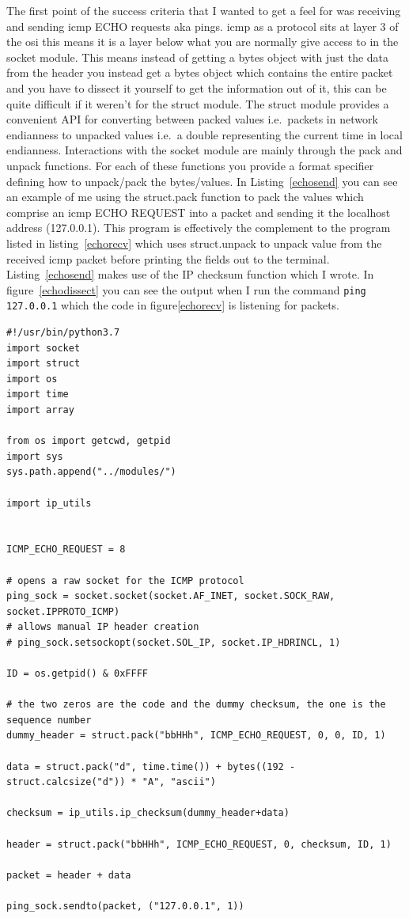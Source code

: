 \documentclass[titlepage]{article}
\begin{document}
The first point of the success criteria that I wanted to get a feel for was receiving and sending
\gls{icmp} ECHO requests aka pings. \gls{icmp} as a protocol sits at layer 3 of the \gls{osi}
this means it is a layer below what you are normally give access to in the socket module. This
means instead of getting a bytes object with just the data from the header you instead get a bytes
object which contains the entire packet and you have to dissect it yourself to get the information
out of it, this can be quite difficult if it weren't for the struct module. The struct module 
provides a convenient API for converting between packed values i.e.\ packets in network endianness
to unpacked values i.e.\ a double representing the current time in local endianness. Interactions
with the socket module are mainly through the pack and unpack functions. For each of these
functions you provide a format specifier defining how to unpack/pack the bytes/values. 
In Listing~\ref{echosend} you can see an example of me using the struct.pack function to pack
the values which comprise an \gls{icmp} ECHO REQUEST into a packet and sending it the localhost
address (127.0.0.1). This program is effectively the complement to the program listed in
listing~\ref{echorecv} which uses struct.unpack to unpack value from the received \gls{icmp}
packet before printing the fields out to the terminal. Listing~\ref{echosend} makes use of the
IP checksum function which I wrote. In figure~\ref{echodissect} you can see the output when
I run the command \verb|ping 127.0.0.1| which the code in figure\ref{echorecv} is listening for
packets.

\begin{lstlisting}[label=echosend,caption=A prototype for sending \gls{icmp} ECHO REQUEST packets.]
#!/usr/bin/python3.7
import socket
import struct
import os
import time
import array

from os import getcwd, getpid
import sys
sys.path.append("../modules/")

import ip_utils


ICMP_ECHO_REQUEST = 8

# opens a raw socket for the ICMP protocol
ping_sock = socket.socket(socket.AF_INET, socket.SOCK_RAW, socket.IPPROTO_ICMP)
# allows manual IP header creation
# ping_sock.setsockopt(socket.SOL_IP, socket.IP_HDRINCL, 1)

ID = os.getpid() & 0xFFFF

# the two zeros are the code and the dummy checksum, the one is the sequence number
dummy_header = struct.pack("bbHHh", ICMP_ECHO_REQUEST, 0, 0, ID, 1)

data = struct.pack("d", time.time()) + bytes((192 - struct.calcsize("d")) * "A", "ascii")

checksum = ip_utils.ip_checksum(dummy_header+data)

header = struct.pack("bbHHh", ICMP_ECHO_REQUEST, 0, checksum, ID, 1)

packet = header + data

ping_sock.sendto(packet, ("127.0.0.1", 1))
\end{lstlisting}
\end{document}
